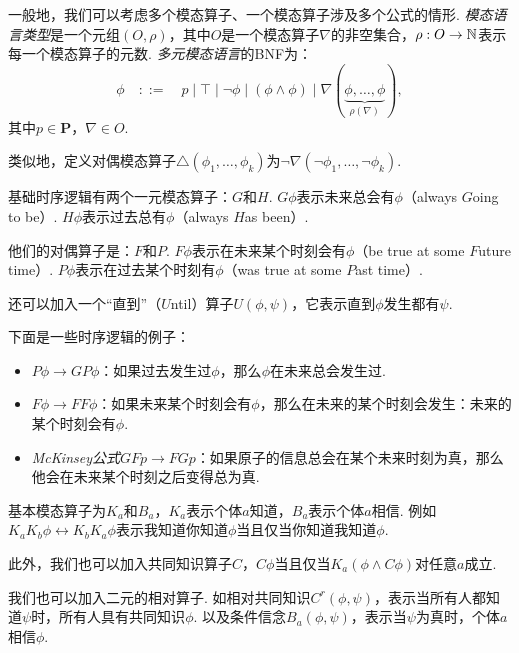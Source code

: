  一般地，我们可以考虑多个模态算子、一个模态算子涉及多个公式的情形. \emph{模态语言类型}是一个元组$(O,\rho)$，其中$O$是一个模态算子$\nabla$的非空集合，$\rho:O\to\mathbb{N}$表示每一个模态算子的元数. \emph{多元模态语言}的BNF为：
    \[\phi\quad::=\quad p\mid \top\mid \neg\phi\mid (\phi\wedge\phi)\mid \nabla(\underbrace{\phi,\dots,\phi}_{\rho(\nabla)}),\]
    其中$p\in \mathbf P$，$\nabla\in O$.

类似地，定义对偶模态算子$\triangle(\phi_1,\dots,\phi_k)$为$\neg\nabla(\neg\phi_1,\dots,\neg\phi_k)$.


\begin{example}[时序逻辑]
基础时序逻辑有两个一元模态算子：$G$和$H$. $G\phi$表示未来总会有$\phi$（always $G$oing to be）. $H\phi$表示过去总有$\phi$（always $H$as been）.

他们的对偶算子是：$F$和$P$. $F\phi$表示在未来某个时刻会有$\phi$（be true at some $F$uture time）. $P\phi$表示在过去某个时刻有$\phi$（was true at some $P$ast time）.

还可以加入一个“直到”（$U$ntil）算子$U(\phi,\psi)$，它表示直到$\phi$发生都有$\psi$.

下面是一些时序逻辑的例子：
\begin{itemize}
    \item $P\phi\to GP\phi$：如果过去发生过$\phi$，那么$\phi$在未来总会发生过.
    \item $F\phi\to FF\phi$：如果未来某个时刻会有$\phi$，那么在未来的某个时刻会发生：未来的某个时刻会有$\phi$.
    \item \emph{McKinsey公式}$GF p\to FG p$：如果原子的信息总会在某个未来时刻为真，那么他会在未来某个时刻之后变得总为真.
\end{itemize}
\end{example}


\begin{example}[认知逻辑]
基本模态算子为$K_a$和$B_a$，$K_a$表示个体$a$知道，$B_a$表示个体$a$相信. 例如$K_aK_b\phi\leftrightarrow K_bK_a\phi$表示我知道你知道$\phi$当且仅当你知道我知道$\phi$.

此外，我们也可以加入共同知识算子$C$，$C \phi$当且仅当$K_a(\phi\wedge C\phi)$对任意$a$成立.

我们也可以加入二元的相对算子. 如相对共同知识$C^r(\phi,\psi)$，表示当所有人都知道$\psi$时，所有人具有共同知识$\phi$. 以及条件信念$B_a(\phi,\psi)$，表示当$\psi$为真时，个体$a$相信$\phi$.
\end{example}


